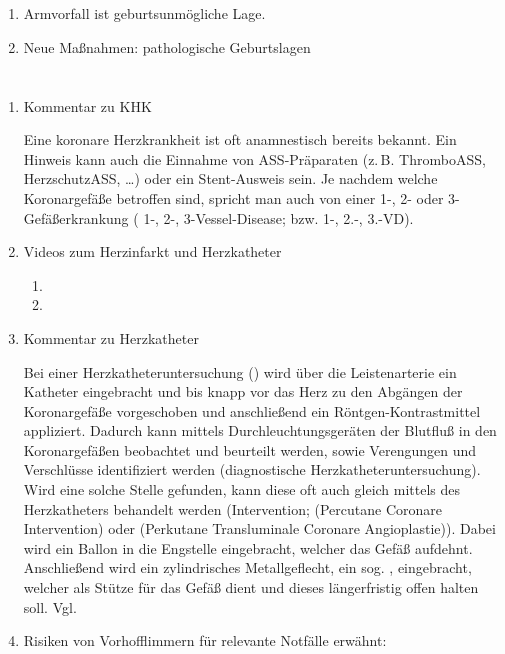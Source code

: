 \documentclass[
ngerman,
paper=a4,
asymmetric,
fontsize=10pt,
headings=small,
draft=false,
numbers=noenddot,
bibtotocnumbered,
footnotes=multiple,
toc=flat,
]{scrreprt}
\newcommand{\Neu}{\fontfamily{lmtt}\fontseries{lc}\selectfont\color{DarkGreen}}
\begin{document}
\section{\CO{[GYN]}}
  \begin{enumerate}
    \item Armvorfall ist geburtsunmögliche Lage.
    \item Neue Maßnahmen: pathologische Geburtslagen
  \end{enumerate}
\section{\CO{[HKL]}}
  \begin{enumerate}
    \item Kommentar zu KHK
    
    {\Neu Eine koronare
    Herzkrankheit ist oft anamnestisch bereits bekannt. Ein
    Hinweis kann auch die Einnahme von ASS-Präparaten (z.\,B.
    ThromboASS{\texttrademark}, HerzschutzASS{\texttrademark},
    \ldots) oder ein Stent-Ausweis sein.
    Je nachdem welche Koronargefäße betroffen sind, spricht man
    auch von einer 1-, 2- oder 3-Gefäßerkrankung (
    1-, 2-, 3-Vessel-Disease; bzw.  1-, 2.-, 3.-VD).}
    
    \item Videos zum Herzinfarkt und Herzkatheter{\Neu
    \begin{enumerate}
      \item {}
      \item {}
    \end{enumerate}
    }
    
    \item Kommentar zu Herzkatheter
    
    {\Neu   Bei
    einer Herzkatheteruntersuchung ()
    wird über die Leistenarterie ein Katheter eingebracht und
    bis knapp vor das Herz zu den Abgängen der Koronargefäße
    vorgeschoben und anschließend ein
    Röntgen-Kontrastmittel appliziert. Dadurch kann mittels
    Durchleuchtungsgeräten der Blutfluß in den  Koronargefäßen
    beobachtet und beurteilt werden, sowie Verengungen und
    Verschlüsse identifiziert werden (diagnostische
    Herzkatheteruntersuchung).
    Wird eine solche Stelle gefunden, kann diese oft auch gleich mittels des
    Herzkatheters behandelt werden
    (Intervention;  (Percutane Coronare
    Intervention) oder  (Perkutane Transluminale
    Coronare Angioplastie)). Dabei wird ein Ballon
    in die Engstelle eingebracht, welcher das Gefäß aufdehnt.
    Anschließend wird ein zylindrisches Metallgeflecht, ein
    sog.
    , eingebracht, welcher als Stütze für das Gefäß
    dient und dieses längerfristig offen halten soll. Vgl.
    \cite{Harrisons18DeKap230,Harrisons18DeKap246}
    }
    \item Risiken von Vorhofflimmern für relevante Notfälle
    erwähnt:
    

\end{enumerate}
\end{document}
